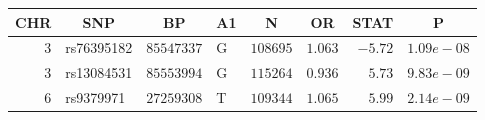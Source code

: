 \begin{tabular}{rlrlrrrr}
\hline\hline
\multicolumn{1}{c}{CHR}&\multicolumn{1}{c}{SNP}&\multicolumn{1}{c}{BP}&\multicolumn{1}{c}{A1}&\multicolumn{1}{c}{N}&\multicolumn{1}{c}{OR}&\multicolumn{1}{c}{STAT}&\multicolumn{1}{c}{P}\tabularnewline
\hline
$3$ & rs76395182 & $85547337$ & G & $108695$ & $1.063$ & $ -5.72$ & $1.09e-08$\tabularnewline
$3$ & rs13084531 & $85553994$ & G & $115264$ & $0.936$ & $5.73$ & $9.83e-09$\tabularnewline
$6$ & rs9379971  & $27259308$ & T & $109344$ & $1.065$ & $ 5.99$ & $2.14e-09$\tabularnewline
\hline
\end{tabular}
